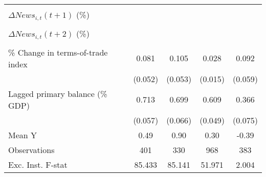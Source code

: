 {\begin{tabular}{l*{4}{c}}
                    &                     &                     &                     &                     \\
\addlinespace
$ \Delta News_{i,t}(t+1)$ (\%)&                     &                     &                     &                     \\
                    &                     &                     &                     &                     \\
\addlinespace
$ \Delta News_{i,t}(t+2)$ (\%)&                     &                     &                     &                     \\
                    &                     &                     &                     &                     \\
\addlinespace
\% Change in terms-of-trade index&       0.081         &       0.105\sym{**} &       0.028\sym{*}  &       0.092         \\
                    &     (0.052)         &     (0.053)         &     (0.015)         &     (0.059)         \\
\addlinespace
Lagged primary balance (\% GDP)&       0.713\sym{***}&       0.699\sym{***}&       0.609\sym{***}&       0.366\sym{***}\\
                    &     (0.057)         &     (0.066)         &     (0.049)         &     (0.075)         \\
\midrule
Mean Y              &        0.49         &        0.90         &        0.30         &       -0.39         \\
Observations        &         401         &         330         &         968         &         383         \\
Exc. Inst. F-stat   &      85.433         &      85.141         &      51.971         &       2.004         \\
\bottomrule
\end{tabular}
}
